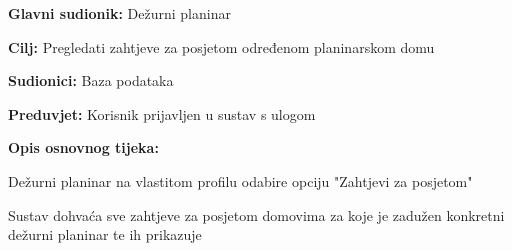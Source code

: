 		
			
			
				
	
		\noindent {}
		\begin{packed_item}
			
			\item \textbf{Glavni sudionik: }$ $Dežurni planinar$ $
			\item  \textbf{Cilj:} $ $Pregledati zahtjeve za posjetom određenom planinarskom domu$ $
			\item  \textbf{Sudionici:} $ $Baza podataka$ $
			\item  \textbf{Preduvjet:} $ $Korisnik prijavljen u sustav s ulogom  $ $
			\item  \textbf{Opis osnovnog tijeka:}
			
			\item[] \begin{packed_enum}
				
				\item $ $Dežurni planinar na vlastitom profilu odabire opciju "Zahtjevi za posjetom"$ $
				\item $ $Sustav dohvaća sve zahtjeve za posjetom domovima za koje je zadužen konkretni dežurni planinar te ih prikazuje$ $
			\end{packed_enum}
		\end{packed_item}
	
